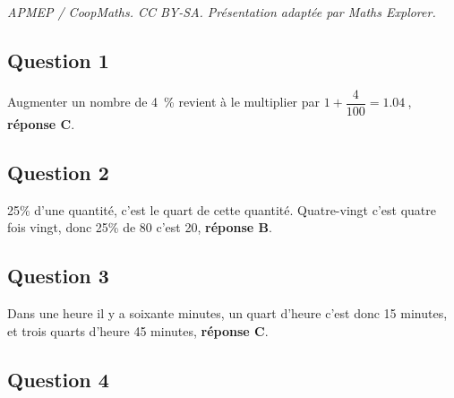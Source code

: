 \documentclass[10pt]{article}
\providecommand{\np}[2][]{{#2~#1}}
\begin{document}
\noindent\textit{APMEP / CoopMaths. CC BY-SA. Présentation adaptée par Maths Explorer.}\par\medskip
\subsection*{Question 1}



Augmenter un nombre de 4~\% revient à le multiplier par \mbox{$1+\dfrac{4}{100}=\np{1.04}$}, \textbf{réponse C}.
















\subsection*{Question 2}



















25\% d'une quantité, c'est le quart de cette quantité. Quatre-vingt c'est quatre fois vingt, donc 25\% de 80 c'est 20, \textbf{réponse B}.
\subsection*{Question 3}



















Dans une heure il y a soixante minutes, un quart d'heure c'est donc 15 minutes, et trois quarts d'heure 45 minutes, \textbf{réponse C}.
\subsection*{Question 4}
\end{document}
